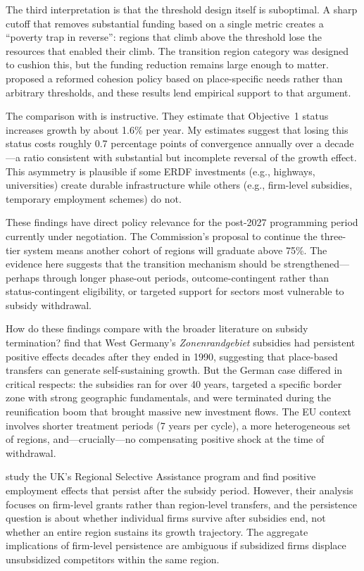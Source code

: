 \documentclass[12pt]{article}
\begin{document}
The third interpretation is that the threshold design itself is suboptimal. A sharp cutoff that removes substantial funding based on a single metric creates a ``poverty trap in reverse'': regions that climb above the threshold lose the resources that enabled their climb. The transition region category was designed to cushion this, but the funding reduction remains large enough to matter. \citet{Barca2009} proposed a reformed cohesion policy based on place-specific needs rather than arbitrary thresholds, and these results lend empirical support to that argument.

The comparison with \citet{BeckerEggerVonEhrlich2010} is instructive. They estimate that Objective~1 status increases growth by about 1.6\% per year. My estimates suggest that losing this status costs roughly 0.7 percentage points of convergence annually over a decade---a ratio consistent with substantial but incomplete reversal of the growth effect. This asymmetry is plausible if some ERDF investments (e.g., highways, universities) create durable infrastructure while others (e.g., firm-level subsidies, temporary employment schemes) do not.

These findings have direct policy relevance for the post-2027 programming period currently under negotiation. The Commission's proposal to continue the three-tier system means another cohort of regions will graduate above 75\%. The evidence here suggests that the transition mechanism should be strengthened---perhaps through longer phase-out periods, outcome-contingent rather than status-contingent eligibility, or targeted support for sectors most vulnerable to subsidy withdrawal.

How do these findings compare with the broader literature on subsidy termination? \citet{GarciaMilaPonce2023} find that West Germany's \emph{Zonenrandgebiet} subsidies had persistent positive effects decades after they ended in 1990, suggesting that place-based transfers can generate self-sustaining growth. But the German case differed in critical respects: the subsidies ran for over 40 years, targeted a specific border zone with strong geographic fundamentals, and were terminated during the reunification boom that brought massive new investment flows. The EU context involves shorter treatment periods (7 years per cycle), a more heterogeneous set of regions, and---crucially---no compensating positive shock at the time of withdrawal.

\citet{CriscuoloMartinOvermanVanReenen2019} study the UK's Regional Selective Assistance program and find positive employment effects that persist after the subsidy period. However, their analysis focuses on firm-level grants rather than region-level transfers, and the persistence question is about whether individual firms survive after subsidies end, not whether an entire region sustains its growth trajectory. The aggregate implications of firm-level persistence are ambiguous if subsidized firms displace unsubsidized competitors within the same region.
\end{document}
